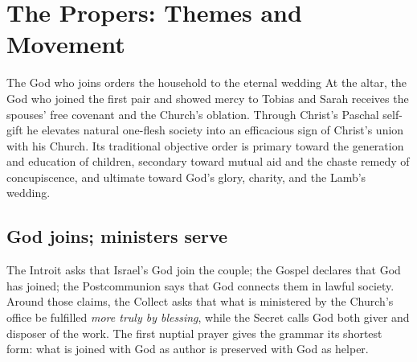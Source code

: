 \begingroup\footnotesize
\setlength{\parskip}{0.30em}
\section*{The Propers: Themes and Movement}

\begin{massbox}{The God who joins orders the household to the eternal wedding}
At the altar, the God who joined the first pair and showed mercy to Tobias and Sarah receives the spouses' free covenant and the Church's oblation. Through Christ's Paschal self-gift he elevates natural one-flesh society into an efficacious sign of Christ's union with his Church. Its traditional objective order is primary toward the generation and education of children, secondary toward mutual aid and the chaste remedy of concupiscence, and ultimate toward God's glory, charity, and the Lamb's wedding.
\end{massbox}

\begin{center}
\end{center}

\subsection*{God joins; ministers serve\enspace{}}

The Introit asks that Israel's God join the couple; the Gospel declares that God has joined; the Postcommunion says that God connects them in lawful society. Around those claims, the Collect asks that what is ministered by the Church's office be fulfilled \emph{more truly by blessing}, while the Secret calls God both giver and disposer of the work. The first nuptial prayer gives the grammar its shortest form: what is joined with God as author is preserved with God as helper.

